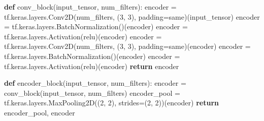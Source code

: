 \documentclass[
  letterpaper,
  DIV=11,
  numbers=noendperiod]{scrreprt}
\newenvironment{Shaded}{\begin{snugshade}}{\end{snugshade}}
\newcommand{\ControlFlowTok}[1]{\textcolor[rgb]{0.00,0.23,0.31}{\textbf{#1}}}
\newcommand{\DecValTok}[1]{\textcolor[rgb]{0.68,0.00,0.00}{#1}}
\newcommand{\KeywordTok}[1]{\textcolor[rgb]{0.00,0.23,0.31}{\textbf{#1}}}
\newcommand{\NormalTok}[1]{\textcolor[rgb]{0.00,0.23,0.31}{#1}}
\newcommand{\OperatorTok}[1]{\textcolor[rgb]{0.37,0.37,0.37}{#1}}
\newcommand{\StringTok}[1]{\textcolor[rgb]{0.13,0.47,0.30}{#1}}
\begin{document}
\begin{Shaded}
\begin{Highlighting}[]
\KeywordTok{def}\NormalTok{ conv\_block(input\_tensor, num\_filters):}
\NormalTok{    encoder }\OperatorTok{=}\NormalTok{ tf.keras.layers.Conv2D(num\_filters, (}\DecValTok{3}\NormalTok{, }\DecValTok{3}\NormalTok{), padding}\OperatorTok{=}\StringTok{\textquotesingle{}same\textquotesingle{}}\NormalTok{)(input\_tensor)}
\NormalTok{    encoder }\OperatorTok{=}\NormalTok{ tf.keras.layers.BatchNormalization()(encoder)}
\NormalTok{    encoder }\OperatorTok{=}\NormalTok{ tf.keras.layers.Activation(}\StringTok{\textquotesingle{}relu\textquotesingle{}}\NormalTok{)(encoder)}
\NormalTok{    encoder }\OperatorTok{=}\NormalTok{ tf.keras.layers.Conv2D(num\_filters, (}\DecValTok{3}\NormalTok{, }\DecValTok{3}\NormalTok{), padding}\OperatorTok{=}\StringTok{\textquotesingle{}same\textquotesingle{}}\NormalTok{)(encoder)}
\NormalTok{    encoder }\OperatorTok{=}\NormalTok{ tf.keras.layers.BatchNormalization()(encoder)}
\NormalTok{    encoder }\OperatorTok{=}\NormalTok{ tf.keras.layers.Activation(}\StringTok{\textquotesingle{}relu\textquotesingle{}}\NormalTok{)(encoder)}
    \ControlFlowTok{return}\NormalTok{ encoder}

\KeywordTok{def}\NormalTok{ encoder\_block(input\_tensor, num\_filters):}
\NormalTok{    encoder }\OperatorTok{=}\NormalTok{ conv\_block(input\_tensor, num\_filters)}
\NormalTok{    encoder\_pool }\OperatorTok{=}\NormalTok{ tf.keras.layers.MaxPooling2D((}\DecValTok{2}\NormalTok{, }\DecValTok{2}\NormalTok{), strides}\OperatorTok{=}\NormalTok{(}\DecValTok{2}\NormalTok{, }\DecValTok{2}\NormalTok{))(encoder)}
    \ControlFlowTok{return}\NormalTok{ encoder\_pool, encoder}


\end{Highlighting}
\end{Shaded}
\end{document}
